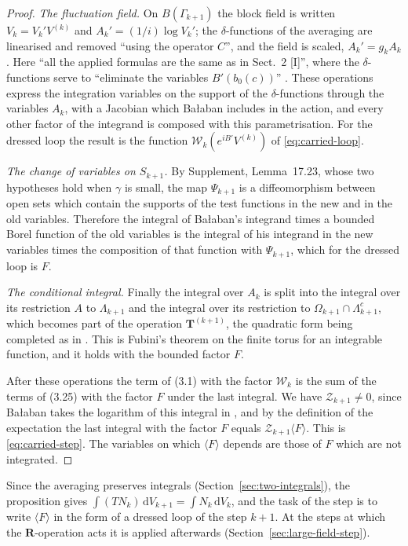 \documentclass[11pt]{preprint}
\newcommand{\dd}{\mathrm{d}}
\numberwithin{equation}{section}
\theoremstyle{definition}
\theoremstyle{remark}
\theoremstyle{plain}
\begin{document}
\begin{proof}
\emph{The fluctuation field.} On $B(\Gamma_{k+1})$ the block field is written $V_k = V_k'V^{(k)}$ and $A_k' = (1/i)\log V_k'$; the $\delta$-functions of the averaging are linearised and removed ``using the operator $C$'', and the field is scaled, $A_k' = g_kA_k$ \cite[(3.11), p.~266; p.~267]{BalabanCRE}. Here ``all the applied formulas are the same as in Sect.~2 [I]'', where the $\delta$-functions serve to ``eliminate the variables $B'(b_0(c))$'' \cite[p.~268]{BalabanRG1}. These operations express the integration variables on the support of the $\delta$-functions through the variables $A_k$, with a Jacobian which Ba{\l}aban includes in the action, and every other factor of the integrand is composed with this parametrisation. For the dressed loop the result is the function $\mathcal W_k(e^{iB'}V^{(k)})$ of \eqref{eq:carried-loop}.

\emph{The change of variables on $S_{k+1}$.} By Supplement, Lemma~17.23, whose two hypotheses hold when $\gamma$ is small, the map $\Psi_{k+1}$ is a diffeomorphism between open sets which contain the supports of the test functions in the new and in the old variables. Therefore the integral of Ba{\l}aban's integrand times a bounded Borel function of the old variables is the integral of his integrand in the new variables times the composition of that function with $\Psi_{k+1}$, which for the dressed loop is $F$.

\emph{The conditional integral.} Finally the integral over $A_k$ is split into the integral over its restriction $A$ to $\Lambda_{k+1}$ and the integral over its restriction to $\Omega_{k+1} \cap \Lambda_{k+1}^c$, which becomes part of the operation $\mathbf T^{(k+1)}$, the quadratic form being completed as in \cite[(3.23)--(3.25), p.~270]{BalabanCRE}. This is Fubini's theorem on the finite torus for an integrable function, and it holds with the bounded factor $F$.

After these operations the term of (3.1) with the factor $\mathcal W_k$ is the sum of the terms of (3.25) with the factor $F$ under the last integral. We have $\mathcal Z_{k+1} \neq 0$, since Ba{\l}aban takes the logarithm of this integral in \cite[(3.26), p.~271]{BalabanCRE}, and by the definition of the expectation the last integral with the factor $F$ equals $\mathcal Z_{k+1}\langle F\rangle$. This is \eqref{eq:carried-step}. The variables on which $\langle F\rangle$ depends are those of $F$ which are not integrated.
\end{proof}

Since the averaging preserves integrals (Section~\ref{sec:two-integrals}), the proposition gives $\int(TN_k)\,\dd V_{k+1} = \int N_k\,\dd V_k$, and the task of the step is to write $\langle F\rangle$ in the form of a dressed loop of the step $k + 1$. At the steps at which the $\mathbf R$-operation acts it is applied afterwards (Section~\ref{sec:large-field-step}).
\end{document}
